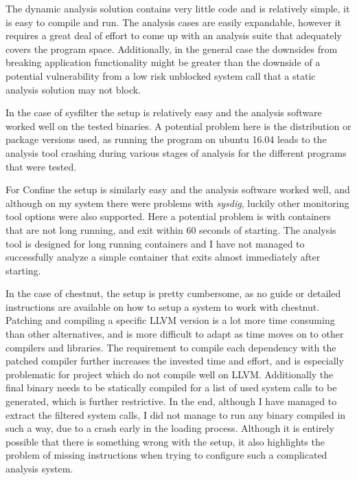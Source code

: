 The dynamic analysis solution contains very little code and is relatively simple, it is easy to compile and run. The analysis cases are easily expandable, however it requires a great deal of effort to come up with an analysis suite that adequately covers the program space. Additionally, in the general case the downsides from breaking application functionality might be greater than the downside of a potential vulnerability from a low risk unblocked system call that a static analysis solution may not block.

In the case of sysfilter the setup is relatively easy and the analysis software worked well on the tested binaries. A potential problem here is the distribution or package versions used, as running the program on ubuntu 16.04 leads to the analysis tool crashing during various stages of analysis for the different programs that were tested.

For Confine the setup is similarly easy and the analysis software worked well, and although on my system there were problems with \textit{sysdig}, luckily other monitoring tool options were also supported.
Here a potential problem is with containers that are not long running, and exit within 60 seconds of starting. The analysis tool is designed for long running containers and I have not managed to successfully analyze a simple container that exits almost immediately after starting.

In the case of chestnut, the setup is pretty cumbersome, as no guide or detailed instructions are available on how to setup a system to work with chestnut.
Patching and compiling a specific LLVM version is a lot more time consuming than other alternatives, and is more difficult to adapt as time moves on to other compilers and libraries.
The requirement to compile each dependency with the patched compiler further increases the invested time and effort, and is especially problematic for project which do not compile well on LLVM.
Additionally the final binary needs to be statically compiled for a list of used system calls to be generated, which is further restrictive.
In the end, although I have managed to extract the filtered system calls, I did not manage to run any binary compiled in such a way, due to a crash early in the loading process.
Although it is entirely possible that there is something wrong with the setup, it also highlights the problem of missing instructions when trying to configure such a complicated analysis system.
